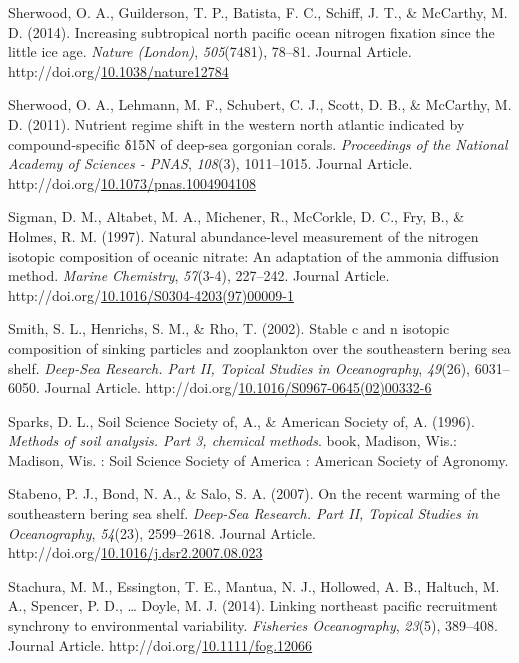 \documentclass [11pt, proquest] {uwthesis}[2015/03/03]
\newlength{\cslhangindent}
\newenvironment{CSLReferences}%
{\setlength{\parindent}{0pt}%
\everypar{\setlength{\hangindent}{\cslhangindent}}\ignorespaces}%
{\par}
\begin{document}
\begin{CSLReferences}{1}{0}
\leavevmode\hypertarget{ref-Sherwood2014}{}%
Sherwood, O. A., Guilderson, T. P., Batista, F. C., Schiff, J. T., \& McCarthy, M. D. (2014). Increasing subtropical north pacific ocean nitrogen fixation since the little ice age. \emph{Nature (London)}, \emph{505}(7481), 78--81. Journal Article. http://doi.org/\href{https://doi.org/10.1038/nature12784}{10.1038/nature12784}

\leavevmode\hypertarget{ref-Sherwood2011}{}%
Sherwood, O. A., Lehmann, M. F., Schubert, C. J., Scott, D. B., \& McCarthy, M. D. (2011). Nutrient regime shift in the western north atlantic indicated by compound-specific δ15N of deep-sea gorgonian corals. \emph{Proceedings of the National Academy of Sciences - PNAS}, \emph{108}(3), 1011--1015. Journal Article. http://doi.org/\href{https://doi.org/10.1073/pnas.1004904108}{10.1073/pnas.1004904108}

\leavevmode\hypertarget{ref-Sigman1997}{}%
Sigman, D. M., Altabet, M. A., Michener, R., McCorkle, D. C., Fry, B., \& Holmes, R. M. (1997). Natural abundance-level measurement of the nitrogen isotopic composition of oceanic nitrate: An adaptation of the ammonia diffusion method. \emph{Marine Chemistry}, \emph{57}(3-4), 227--242. Journal Article. http://doi.org/\href{https://doi.org/10.1016/S0304-4203(97)00009-1}{10.1016/S0304-4203(97)00009-1}

\leavevmode\hypertarget{ref-Smith2002}{}%
Smith, S. L., Henrichs, S. M., \& Rho, T. (2002). Stable c and n isotopic composition of sinking particles and zooplankton over the southeastern bering sea shelf. \emph{Deep-Sea Research. Part II, Topical Studies in Oceanography}, \emph{49}(26), 6031--6050. Journal Article. http://doi.org/\href{https://doi.org/10.1016/S0967-0645(02)00332-6}{10.1016/S0967-0645(02)00332-6}

\leavevmode\hypertarget{ref-Sparks1996}{}%
Sparks, D. L., Soil Science Society of, A., \& American Society of, A. (1996). \emph{Methods of soil analysis. Part 3, chemical methods}. book, Madison, Wis.: Madison, Wis. : Soil Science Society of America : American Society of Agronomy.

\leavevmode\hypertarget{ref-Stabeno2007}{}%
Stabeno, P. J., Bond, N. A., \& Salo, S. A. (2007). On the recent warming of the southeastern bering sea shelf. \emph{Deep-Sea Research. Part II, Topical Studies in Oceanography}, \emph{54}(23), 2599--2618. Journal Article. http://doi.org/\href{https://doi.org/10.1016/j.dsr2.2007.08.023}{10.1016/j.dsr2.2007.08.023}

\leavevmode\hypertarget{ref-Stachura2014}{}%
Stachura, M. M., Essington, T. E., Mantua, N. J., Hollowed, A. B., Haltuch, M. A., Spencer, P. D., \ldots{} Doyle, M. J. (2014). Linking northeast pacific recruitment synchrony to environmental variability. \emph{Fisheries Oceanography}, \emph{23}(5), 389--408. Journal Article. http://doi.org/\href{https://doi.org/10.1111/fog.12066}{10.1111/fog.12066}


\end{CSLReferences}
\end{document}
